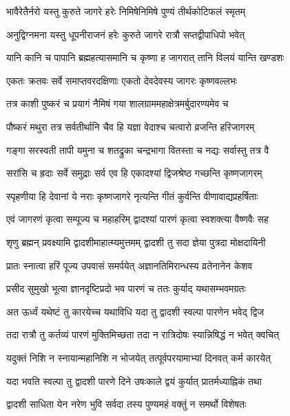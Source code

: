 \twolineshloka
{भावैरेतैर्नरो यस्तु कुरुते जागरे हरेः}
{निमिषेनिमिषे पुण्यं तीर्थकोटिफलं स्मृतम्}%

\twolineshloka
{अनुद्विग्नमना यस्तु धूपनीराजनं हरेः}
{कुरुते जागरे रात्रौ सप्तद्वीपाधिपो भवेत्}%

\twolineshloka
{यानि कानि च पापानि ब्रह्महत्यासमानि च}
{कृष्णा ह जागरात् तानि विलयं यान्ति खण्डशः}%

\twolineshloka
{एकतः क्रतवः सर्वे समाप्तवरदक्षिणाः}
{एकतो देवदेवस्य जागरः कृष्णवल्लभः}%

\twolineshloka
{तत्र काशी पुष्करं च प्रयागं नैमिषं गया}
{शालग्राममहाक्षेत्रमर्बुदारण्यमेव च}%

\twolineshloka
{पौष्करं मथुरा तत्र सर्वतीर्थानि चैव हि}
{यज्ञा वेदाश्च चत्वारो व्रजन्ति हरिजागरम्}%

\twolineshloka
{गङ्गा सरस्वती तापी यमुना च शतद्रुका}
{चन्द्रभागा वितस्ता च नद्यः सर्वास्तु तत्र वै}%

\twolineshloka
{सरांसि च ह्रदाः सर्वे समुद्राः सर्व एव हि}
{एकादश्यां द्विजश्रेष्ठ गच्छन्ति कृष्णजागरम्}%

\twolineshloka
{स्पृहणीया हि देवानां ये नराः कृष्णजागरे}
{नृत्यन्ति गीतं कुर्वन्ति वीणावाद्यप्रहर्षिताः}%

\twolineshloka
{एवं जागरणं कृत्वा सम्पूज्य च महाहरिम्}
{द्वादश्यां पारणं कृत्वा स्वशक्त्या वैष्णवैः सह}%


\twolineshloka
{शृणु ब्रह्मन् प्रवक्ष्यामि द्वादशीमाहात्म्यमुत्तमम्}
{द्वादशी तु सदा ज्ञेया पुत्रदा मोक्षदायिनी}%

\twolineshloka
{प्रातः स्नात्वा हरिं पूज्य उपवासं समर्पयेत्}
{अज्ञानतिमिरान्धस्य व्रतेनानेन केशव}%

\twolineshloka
{प्रसीद सुमुखो भूत्वा ज्ञानदृष्टिप्रदो भव}
{पारणं च ततः कुर्याद् यथासम्भवमग्रतः}%

\twolineshloka
{अत ऊर्ध्वं यथेष्टं तु कारयेच्च यथाविधि}
{यदा तु द्वादशी स्वल्पा पारणेन भवेद् द्विज}%

\twolineshloka
{तदा रात्रौ तु कर्तव्यं पारणं मुक्तिमिच्छता}
{तदा न रात्रिदोषः स्यान्निषिद्धं न भवेत् क्वचित्}%

\twolineshloka
{यदुक्तं निशि न स्नायान्महानिशि न भोजयेत्}
{तत्पूर्वपरयामाभ्यां दिनवत् कर्म कारयेत्}%

\twolineshloka
{यदा भवति स्वल्पा तु द्वादशी पारणे दिने}
{उषःकाले  द्वयं कुर्यात् प्रातर्मध्याह्निकं तथा}%

\twolineshloka
{द्वादशी साधिता येन नरेण भुवि सर्वदा}
{तस्य पुण्यमहं वक्तुं न समर्थो विशेषतः}%

